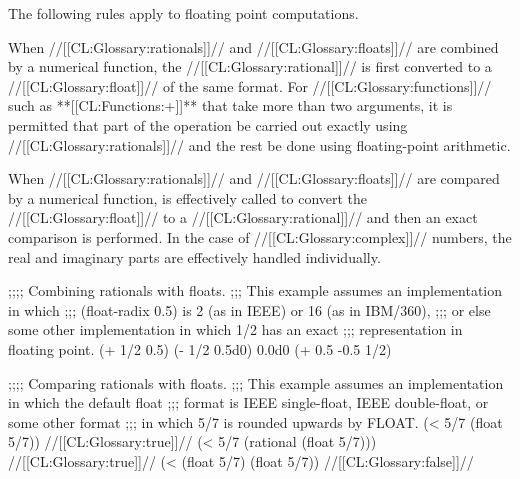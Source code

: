The following rules apply to floating point computations.

  

When //[[CL:Glossary:rationals]]// and //[[CL:Glossary:floats]]// are combined by a numerical function,  the //[[CL:Glossary:rational]]// is first converted to a //[[CL:Glossary:float]]// of the same format. For //[[CL:Glossary:functions]]// such as **[[CL:Functions:+]]** that take more than two arguments, it is permitted that part of the operation be carried out exactly using //[[CL:Glossary:rationals]]// and the rest be done using floating-point arithmetic.

When //[[CL:Glossary:rationals]]// and //[[CL:Glossary:floats]]// are compared by a numerical function,   is effectively called to convert the //[[CL:Glossary:float]]//  to a //[[CL:Glossary:rational]]// and then an exact comparison is performed. In the case of //[[CL:Glossary:complex]]// numbers, the real and imaginary parts are effectively handled individually.


\code
 ;;;; Combining rationals with floats.
 ;;; This example assumes an implementation in which 
 ;;; (float-radix 0.5) is 2 (as in IEEE) or 16 (as in IBM/360),
 ;;; or else some other implementation in which 1/2 has an exact 
 ;;;  representation in floating point.
 (+ 1/2 0.5) 
 (- 1/2 0.5d0) \EV 0.0d0
 (+ 0.5 -0.5 1/2) 

 ;;;; Comparing rationals with floats.
 ;;; This example assumes an implementation in which the default float 
 ;;; format is IEEE single-float, IEEE double-float, or some other format
 ;;; in which 5/7 is rounded upwards by FLOAT.
 (< 5/7 (float 5/7)) \EV //[[CL:Glossary:true]]//
 (< 5/7 (rational (float 5/7))) \EV //[[CL:Glossary:true]]//
 (< (float 5/7) (float 5/7)) \EV //[[CL:Glossary:false]]// \endcode

\endsubsubsection%

\endsubsubsection%


